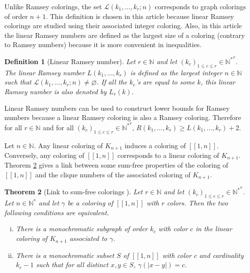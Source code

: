 \documentclass{article}
\newtheorem{definition}{Definition}[section]
\newtheorem{theorem}[definition]{Theorem}
\begin{document}
Unlike Ramsey colorings, the set \(\mathcal{L}(k_1, ..., k_r ; n)\) corresponds to graph colorings of order \(n + 1\). 
This definition is chosen in this article because linear Ramsey colorings are studied using their associated integer 
coloring. Also, in this article the linear Ramsey numbers are defined as the largest size of a coloring (contrary to 
Ramsey numbers) because it is more convenient in inequalities.

\begin{definition}[Linear Ramsey number]
Let \(r \in \mathbb{N}\) and let \((k_c)_{1 \leqslant c \leqslant r} \in {\mathbb{N}^*}^r\). The linear Ramsey number 
\(L(k_1, ..., k_r)\) is defined as the largest integer \(n \in \mathbb{N}\) such that 
\(\mathcal{L}(k_1, ..., k_r ; n) \neq \varnothing\). If all the \(k_c\)'s are equal to some \(k\), this linear Ramsey 
number is also denoted by \(L_r(k)\).
\end{definition}

Linear Ramsey numbers can be used to construct lower bounds for Ramsey numbers because a linear Ramsey coloring is 
also a Ramsey coloring. Therefore for all \(r \in \mathbb{N}\) and for all 
\((k_c)_{1 \leqslant c \leqslant r} \in {\mathbb{N}^*}^r\), \(R(k_1, ..., k_r) \geqslant L(k_1, ..., k_r) + 2\).

Let \(n \in \mathbb{N}\). Any linear coloring of \(K_{n + 1}\) induces a coloring of \([\![1, n]\!]\). Conversely, any 
coloring of \([\![1, n]\!]\) corresponds to a linear coloring of \(K_{n + 1}\). Theorem \ref{thm:linkintegers} gives a 
link between some sum-free properties of the coloring of \([\![1, n]\!]\) and the clique numbers of the associated 
coloring of \(K_{n+1}\).

\begin{theorem}[Link to sum-free colorings \cite{AbbottHanson}]
\label{thm:linkintegers}
Let \(r \in \mathbb{N}\) and let \((k_c)_{1 \leqslant c \leqslant r} \in {\mathbb{N}^*}^r\). Let \(n \in \mathbb{N}^*\) 
and let \(\gamma\) be a coloring of \([\![1, n]\!]\) with \(r\) colors. Then the two following conditions are equivalent.
\begin{enumerate}[(i)]
\item There is a monochromatic subgraph of order \(k_c\) with color \(c\) in the linear coloring of \(K_{n+1}\) 
	associated  to \(\gamma\).
\item There is a monochromatic subset \(S\) of \([\![1, n]\!]\) with color \(c\) and cardinality \(k_c - 1\) such that 
	for all distinct \(x, y \in S\), \(\gamma(|x - y|) = c\).
\end{enumerate}
\end{theorem}
\end{document}
